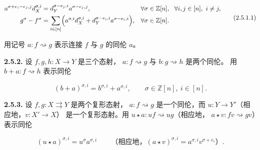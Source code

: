 \begin{equation}
  \begin{aligned}
    a^{\sigma+e_i-e_j,j}d_X^{\sigma,i}
      &=d_Y^{\sigma-e_j,i}a^{\sigma-e_j,j},
      &&\forall\sigma\in\mathbb Z[n],\
        \ \forall i,j\in[n],\ i\ne j,\\
    g^\sigma-f^\sigma
      &=\sum_{i\in[n]}\Bigl(
          a^{\sigma,i}d_X^{\sigma,i}
          +d_Y^{\sigma-e_i,i}a^{\sigma-e_i,i}\Bigr),
      &&\forall\sigma\in\mathbb Z[n].
  \end{aligned}
  \tag{2.5.1.1}
\end{equation}

用记号 $a\colon f\rightsquigarrow g$ 表示连接 $f$ 与 $g$ 的同伦 $a$。

\noindent\textbf{2.5.2.}\quad
设 $f,g,h\colon X\longrightarrow Y$ 是三个态射，
$a\colon f\rightsquigarrow g$ 与 $b\colon g\rightsquigarrow h$ 是两个同伦。
用 $b+a\colon f\rightsquigarrow h$ 表示同伦

\begin{equation*}
  (b+a)^{\sigma,i}=b^{\sigma,i}+a^{\sigma,i},
  \qquad \sigma\in\mathbb Z[n],\ i\in[n].
\end{equation*}

\noindent\textbf{2.5.3.}\quad
设 $f,g\colon X\rightrightarrows Y$ 是两个复形态射，
$a\colon f\rightsquigarrow g$ 是一个同伦，而
$u\colon Y\longrightarrow Y'$（相应地，$v\colon X'\longrightarrow X$）
是一个复形态射。用
$u\star a\colon uf\rightsquigarrow ug$（相应地，
$a\star v\colon fv\rightsquigarrow gv$）表示同伦

\begin{equation*}
  (u\star a)^{\sigma,i}=u^\sigma a^{\sigma,i}
  \qquad
  \text{（相应地，}(a\star v)^{\sigma,i}
    =a^{\sigma,i}v^{\sigma+e_i}\text{）}.
\end{equation*}
